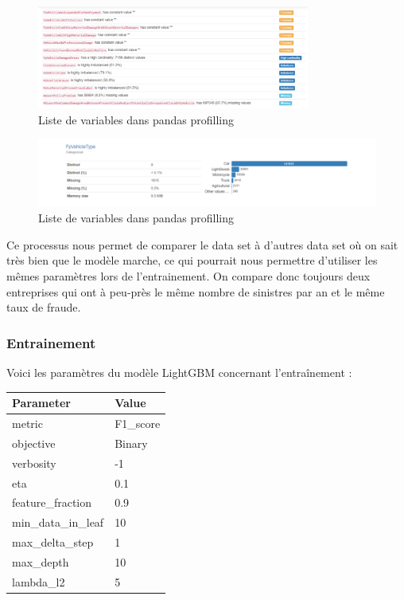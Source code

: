 \documentclass [twoside,openright,a4paper,11pt,french] {report}
\begin{document}
\begin{figure}[htbp]
    \centering
    \includegraphics[width=0.80\textwidth]{ProfillingVariables.png}
    \caption{Liste de variables dans pandas profilling}
    \label{fig:entonnoir}
\end{figure}
\begin{figure}[htbp]
    \centering
    \includegraphics[width=1.50\textwidth]{FpVehicle.png}
    \caption{Liste de variables dans pandas profilling}
    \label{fig:entonnoir}
\end{figure}

Ce processus nous permet de comparer le data set à d'autres data set où on sait très bien que le modèle marche, ce qui pourrait nous permettre 
d'utiliser les mêmes paramètres lors de l'entrainement. On compare donc toujours deux entreprises qui ont à peu-près le même nombre 
de sinistres par an et le même taux de fraude. 

\subsubsection{Entrainement}

Voici les paramètres du modèle LightGBM concernant l'entraînement : 

\begin{center}
\begin{tabular}{ll}
\toprule
\textbf{Parameter} & \textbf{Value} \\
\midrule
metric & F1\_score \\
objective & Binary \\
verbosity & -1 \\
eta & 0.1 \\
feature\_fraction & 0.9 \\
min\_data\_in\_leaf & 10 \\
max\_delta\_step & 1 \\
max\_depth & 10 \\
lambda\_l2 & 5 \\
\bottomrule
\end{tabular}
\end{center}
\end{document}
